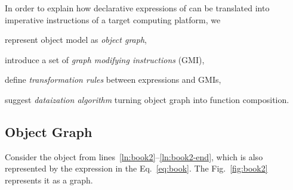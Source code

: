 \renewcommand\therule{R\arabic{rule}}
\newcommand\rr{\smalltriangleright{}}
\newcommand\rrule[1]{{\scshape\sffamily\ref{rule:#1}}}
\newcommand{\jrule}[1]{%
  \refstepcounter{rule}\label{rule:#1}%
  \text{\color{red!50!black}\textbf{\rrule{#1}}}}
\newcommand*{\ohat}[2]{%
  \stackrel{\textcolor{gray}{#1}}{%
    \textcolor{gray}{%
      \overlinesegment{\textcolor{black}{%
        \vrule height 8pt depth 1pt width 0pt%
        #2%
      }}%
    }%
  }%
}
\newenvironment{algo}
  {\begin{tcolorbox}[enhanced,before skip=3pt,after skip=3pt,colback=white,frame hidden,left=3pt,top=0pt,bottom=0pt,borderline west={1pt}{0pt}{gray}]
  \newcommand\kw[1]{{\bfseries\sffamily ##1}}
  \newcommand\tab{{\hspace*{1em}}}
  \noindent}
  {\end{tcolorbox}}

In order to explain how declarative expressions of \phic{} can
be translated into imperative instructions of a target computing platform, we
\begin{inparaenum}[1)]
\item represent object model as \emph{object graph},
\item introduce a set of \emph{graph modifying instructions} (GMI),
\item define \emph{transformation rules} between \phic{} expressions and GMIs,
\item suggest \emph{dataization algorithm} turning object graph into function composition.
\end{inparaenum}

\subsection{Object Graph}

Consider the object from lines~\ref{ln:book2}--\ref{ln:book2-end},
which is also represented by the expression in the Eq.~\ref{eq:book}.
The Fig.~\ref{fig:book2} represents it as a graph.

